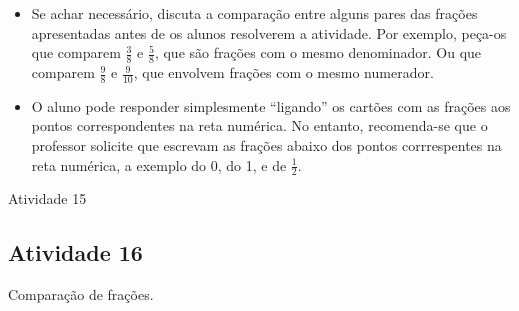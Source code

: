 \documentclass[oneside]{book}
\begin{document}
\begin{multicols}{2}
\begin{itemize}
    \item       Se achar necessário, discuta a comparação entre alguns pares das frações apresentadas antes de os alunos resolverem a atividade. Por exemplo, peça-os que comparem       $\frac{3}{8}$        e       $\frac{5}{8}$, que são frações com o mesmo denominador. Ou que comparem       $\frac{9}{8}$       e       $\frac{9}{10}$, que envolvem frações com o mesmo numerador.
    \item       O aluno pode responder simplesmente       ``ligando''       os cartões com as frações aos pontos correspondentes na reta numérica. No entanto, recomenda-se que o professor solicite que escrevam as frações abaixo dos pontos corrrespentes na reta numérica, a exemplo do 0, do 1, e de       $\frac{1}{2}$.
\end{itemize} %
 
\begin{resposta*}{Atividade 15}

  
\end{resposta*}

\subsection{Atividade 16}

   Comparação de frações.


\end{multicols}
\end{document}
